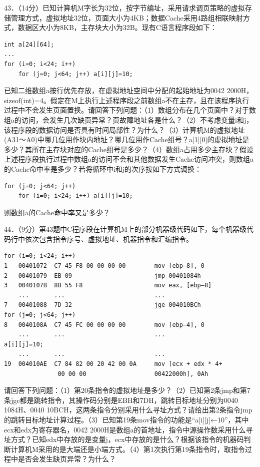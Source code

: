 \documentclass[UTF8,11pt]{ctexart}
\begin{document}
43．（14分）已知计算机M字长为32位，按字节编址，采用请求调页策略的虚拟存储管理方式，虚拟地址32位，页面大小为4KB；数据Cache采用4路组相联映射方式，数据区大小为8KB，主存块大小为32B。现有C语言程序段如下：


\begin{Verbatim}[breaklines,breakanywhere,fontsize=\small]
int a[24][64];
...
for (i=0; i<24; i++)
    for (j=0; j<64; j++) a[i][j]=10;
\end{Verbatim}

已知二维数组a按行优先存放，在虚拟地址空间中分配的起始地址为0042 2000H，sizeof(int)=4。假定在M上执行上述程序段之前数组a不在主存，且在该程序执行过程中不会发生页面置换。请回答下列问题：（1）数组分布在几个页面中？对于数组a的访问，会发生几次缺页异常？页故障地址各是什么？（2）不考虑变量i和j，该程序段的数据访问是否具有时间局部性？为什么？（3）计算机M的虚拟地址(A31～A0)中哪几位用作块内地址？哪几位用作Cache组号？a[1][0]的虚拟地址是多少？其所在主存块对应的Cache组号是多少？（4）数组a占用多少主存块？假设上述程序段执行过程中数组a的访问不会和其他数据发生Cache访问冲突，则数组a的Cache命中率是多少？若将循环中i和j的次序按如下方式调换：


\begin{Verbatim}[breaklines,breakanywhere,fontsize=\small]
for (j=0; j<64; j++)
    for (i=0; i<24; i++) a[i][j]=10;
\end{Verbatim}

则数组a的Cache命中率又是多少？


44．（9分）第43题中C程序段在计算机M上的部分机器级代码如下，每个机器级代码行中依次包含指令序号、虚拟地址、机器指令和汇编指令。


\begin{Verbatim}[breaklines,breakanywhere,fontsize=\small]
for (i=0; i<24; i++)
1   00401072  C7 45 F8 00 00 00 00        mov [ebp–8], 0
2   00401079  EB 09                       jmp 00401084h
3   0040107B  8B 55 F8                    mov eax, [ebp–8]
    ...       ...                         ...
7   00401088  7D 32                       jge 004010BCh
for (j=0; j<64; j++)
8   0040108A  C7 45 FC 00 00 00 00        mov [ebp–4], 0
    ...       ...                         ...
a[i][j]=10;
    ...       ...                         ...
19  004010AE  C7 84 82 00 20 42 00 0A     mov [ecx + edx * 4+
               00 00 00                   00422000h], 0Ah
\end{Verbatim}

请回答下列问题：（1）第20条指令的虚拟地址是多少？（2）已知第2条jmp和第7条jge都是跳转指令，其操作码分别是EBH和7DH，跳转目标地址分别为0040 1084H、0040 10BCH，这两条指令分别采用什么寻址方式？请给出第2条指令jmp的跳转目标地址计算过程。（3）已知第19条mov指令的功能是“a[i][j]←10”，其中ecx和edx为寄存器名，0042 2000H是数组a的首地址，指令中源操作数采用什么寻址方式？已知edx中存放的是变量j，ecx中存放的是什么？根据该指令的机器码判断计算机M采用的是大端还是小端方式。（4）第1次执行第19条指令时，取指令过程中是否会发生缺页异常？为什么？
\end{document}
